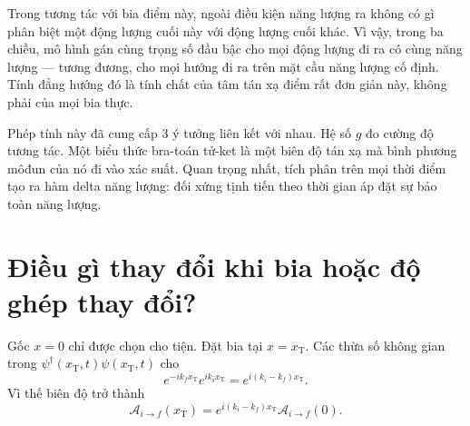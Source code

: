 \begin{classroomqa}
\end{classroomqa}


Trong tương tác với bia điểm này, ngoài điều kiện năng lượng ra không có gì phân biệt một động lượng cuối này với động lượng cuối khác. Vì vậy, trong ba chiều, mô hình gán cùng trọng số đầu bậc cho mọi động lượng đi ra có cùng năng lượng --- tương đương, cho mọi hướng đi ra trên mặt cầu năng lượng cố định. Tính đẳng hướng đó là tính chất của tâm tán xạ điểm rất đơn giản này, không phải của mọi bia thực.

Phép tính này đã cung cấp 3 ý tưởng liên kết với nhau. Hệ số \(g\) đo cường độ tương tác. Một biểu thức bra-toán tử-ket là một biên độ tán xạ mà bình phương môđun của nó đi vào xác suất. Quan trọng nhất, tích phân trên mọi thời điểm tạo ra hàm delta năng lượng: đối xứng tịnh tiến theo thời gian áp đặt sự bảo toàn năng lượng.

\section{Điều gì thay đổi khi bia hoặc độ ghép thay đổi?}

Gốc \(x=0\) chỉ được chọn cho tiện. Đặt bia tại \(x=x_{\mathrm T}\). Các thừa số không gian trong \(\psi^\dagger(x_{\mathrm T},t)\psi(x_{\mathrm T},t)\) cho
\begin{equation}
e^{-ik_f x_{\mathrm T}}e^{ik_i x_{\mathrm T}}
=e^{i(k_i-k_f)x_{\mathrm T}}.
\end{equation}
Vì thế biên độ trở thành
\begin{equation}
\mathcal A_{i\to f}(x_{\mathrm T})
=e^{i(k_i-k_f)x_{\mathrm T}}
\mathcal A_{i\to f}(0).
\end{equation}

